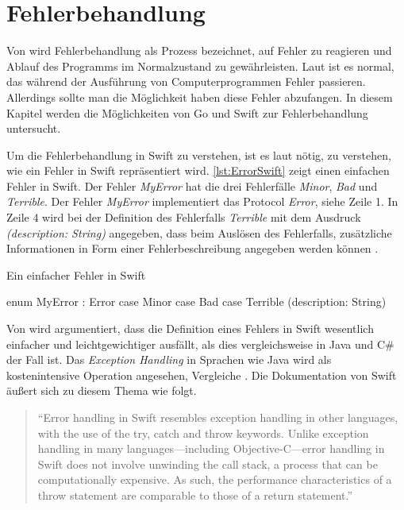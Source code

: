 \chapter{Fehlerbehandlung}
Von \cite[S.310]{Apple.2017} wird Fehlerbehandlung als Prozess bezeichnet, auf Fehler zu reagieren und Ablauf des Programms im Normalzustand zu gewährleisten.
Laut \cite[S.77]{Manning.2016} ist es normal, das während der Ausführung von Computerprogrammen Fehler passieren. 
Allerdings sollte man die Möglichkeit haben diese Fehler abzufangen. 
In diesem Kapitel werden die Möglichkeiten von Go und Swift zur Fehlerbehandlung untersucht.


Um die Fehlerbehandlung in Swift zu verstehen, ist es laut \cite[S.175]{Hoffman.2017} nötig, zu verstehen, wie ein Fehler in Swift repräsentiert wird.
\autoref{lst:ErrorSwift} zeigt einen einfachen Fehler in Swift.
Der Fehler \textit{MyError} hat die drei Fehlerfälle \textit{Minor}, \textit{Bad} und \textit{Terrible}.
Der Fehler \textit{MyError} implementiert das Protocol \textit{Error}, siehe Zeile 1. 
In Zeile 4 wird bei der Definition des Fehlerfalls \textit{Terrible} mit dem Ausdruck \textit{(description: String)} angegeben, dass beim Auslösen des Fehlerfalls, zusätzliche Informationen in Form einer Fehlerbeschreibung angegeben werden können \cite[S.175]{Hoffman.2017}.

\begin{listing}
\caption{Ein einfacher Fehler in Swift \cite[S.175]{Hoffman.2017}}
\label{lst:ErrorSwift}
\begin{SwiftCode}
enum MyError : Error {
    case Minor
    case Bad 
    case Terrible (description: String)
}
\end{SwiftCode}
\end{listing}

Von \cite[S.175]{Hoffman.2017} wird argumentiert, dass die Definition eines Fehlers in Swift wesentlich einfacher und leichtgewichtiger ausfällt, als dies vergleichsweise in Java und C\# der Fall ist.
Das \textit{Exception Handling} in Sprachen wie Java wird als kostenintensive Operation angesehen, Vergleiche \cite[]{JavaExceptions}. 
Die Dokumentation von Swift äußert sich zu diesem Thema wie folgt.

\begin{quote}
\enquote{Error handling in Swift resembles exception handling in other languages, with the use of the try, catch and throw
keywords. Unlike exception handling in many languages—including Objective-C—error handling in Swift does not involve
unwinding the call stack, a process that can be computationally expensive. As such, the performance characteristics of a
throw statement are comparable to those of a return statement.} \cite[S.311]{Apple.2017}
\end{quote}

